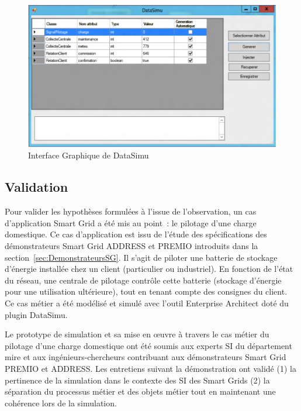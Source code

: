 \begin{figure}[!ht]
  \centering
  \includegraphics[width=1\textwidth]{figures/6_methodologie/data_simu.png}
  \caption{Interface Graphique de DataSimu}
  \label{fig:data_simu}
\end{figure}
				
\subsection{Validation}
Pour valider les hypothèses formulées à l'issue de l'observation, un cas 
d'application Smart Grid a été mis au point~: le pilotage d'une charge 
domestique. Ce cas d'application est issu de l'étude des spécifications des 
démonstrateurs Smart Grid ADDRESS et PREMIO introduits dans la 
section~\ref{sec:DemonstrateursSG}. Il s'agit de piloter une batterie de 
stockage d'énergie installée chez un client (particulier ou industriel). En 
fonction de l'état du réseau, une centrale de pilotage contrôle cette batterie 
(stockage d'énergie pour une utilisation ultérieure), tout en tenant compte des 
consignes du client. Ce cas métier a été modélisé et simulé avec l'outil 
Enterprise Architect doté du plugin DataSimu.
			
Le prototype de simulation et sa mise en œuvre à travers le cas métier du 
pilotage d'une charge domestique ont été soumis aux experts SI du département 
\gls{mire} et aux ingénieurs-chercheurs contribuant aux démonstrateurs Smart 
Grid PREMIO et ADDRESS. Les entretiens suivant la démonstration ont validé (1) 
la pertinence de la simulation dans le contexte des SI des Smart Grids (2) la 
séparation du processus métier et des objets métier tout en maintenant une 
cohérence lors de la simulation.
			
